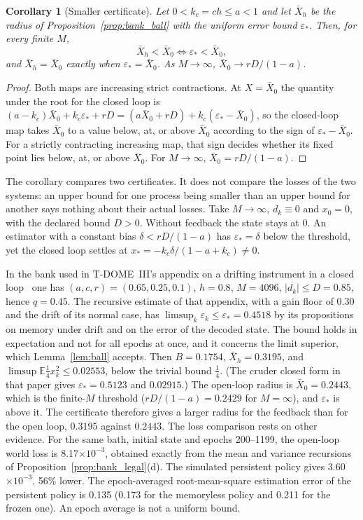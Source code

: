 \documentclass[12pt]{article}
\newtheorem{corollary}[theorem]{Corollary}
\theoremstyle{definition}
\theoremstyle{remark}
\begin{document}
\begin{corollary}[Smaller certificate]\label{cor:bank_threshold}
Let $0<k_c=ch\le a<1$ and let $\bar X_h$ be the radius of Proposition~\ref{prop:bank_ball} with the uniform error bound $\varepsilon_*$. Then, for every finite $M$,
\[
\bar X_h<\bar X_0\iff\varepsilon_*<\bar X_0 ,
\]
and $\bar X_h=\bar X_0$ exactly when $\varepsilon_*=\bar X_0$. As $M\to\infty$, $\bar X_0\to rD/(1-a)$.
\end{corollary}
\begin{proof}
Both maps are increasing strict contractions. At $X=\bar X_0$ the quantity under the root for the closed loop is $(a-k_c)\bar X_0+k_c\varepsilon_*+rD=(a\bar X_0+rD)+k_c(\varepsilon_*-\bar X_0)$, so the closed-loop map takes $\bar X_0$ to a value below, at, or above $\bar X_0$ according to the sign of $\varepsilon_*-\bar X_0$. For a strictly contracting increasing map, that sign decides whether its fixed point lies below, at, or above $\bar X_0$. For $M\to\infty$, $\bar X_0=rD/(1-a)$.
\end{proof}

The corollary compares two certificates. It does not compare the losses of the two systems: an upper bound for one process being smaller than an upper bound for another says nothing about their actual losses. Take $M\to\infty$, $d_k\equiv0$ and $x_0=0$, with the declared bound $D>0$. Without feedback the state stays at $0$. An estimator with a constant bias $\delta<rD/(1-a)$ has $\varepsilon_*=\delta$ below the threshold, yet the closed loop settles at $x_*=-k_c\delta/(1-a+k_c)\ne0$.

In the bank used in T-DOME~III's appendix on a drifting instrument in a closed loop~\cite{TDOMEIII} one has $(a,c,r)=(0.65,0.25,0.1)$, $h=0.8$, $M=4096$, $|d_k|\le D=0.85$, hence $q=0.45$. The recursive estimate of that appendix, with a gain floor of $0.30$ and the drift of its normal case, has $\limsup_k\varepsilon_k\le\varepsilon_*=0.4518$ by its propositions on memory under drift and on the error of the decoded state. The bound holds in expectation and not for all epochs at once, and it concerns the limit superior, which Lemma~\ref{lem:ball} accepts. Then $B=0.1754$, $\bar X_h=0.3195$, and $\limsup\mathbb E\tfrac14x_k^2\le0.02553$, below the trivial bound $\tfrac14$. (The cruder closed form in that paper gives $\varepsilon_*=0.5123$ and $0.02915$.) The open-loop radius is $\bar X_0=0.2443$, which is the finite-$M$ threshold ($rD/(1-a)=0.2429$ for $M=\infty$), and $\varepsilon_*$ is above it. The certificate therefore gives a larger radius for the feedback than for the open loop, $0.3195$ against $0.2443$. The loss comparison rests on other evidence. For the same bath, initial state and epochs 200--1199, the open-loop world loss is 8.17$\times10^{-3}$, obtained exactly from the mean and variance recursions of Proposition~\ref{prop:bank_legal}(d). The simulated persistent policy gives 3.60$\times10^{-3}$, 56\% lower. The epoch-averaged root-mean-square estimation error of the persistent policy is 0.135 (0.173 for the memoryless policy and 0.211 for the frozen one). An epoch average is not a uniform bound.
\end{document}
